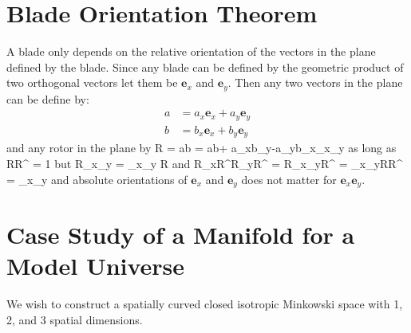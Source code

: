 \chapter{Blade Orientation Theorem}
A blade only depends on the relative orientation of the vectors in the plane defined by the blade.
Since any blade can be defined by the geometric product of two orthogonal vectors let them be $\bm{e}_{x}$ and $\bm{e}_{y}$. 
Then any two vectors in the plane can be define by:
\begin{align}
	a & = a_{x}\bm{e}_{x}+a_{y}\bm{e}_{y} \\
	b & = b_{x}\bm{e}_{x}+b_{y}\bm{e}_{y} 	
\end{align}
and any rotor in the plane by
\be
	R = ab = \lp a\cdot b\rp + \lp a_{x}b_{y}-a_{y}b_{x}\rp {}_{x}_{y}
\ee
as long as
\be
	RR^{\R} = 1
\ee
but
\be
	R_{x}_{y} = _{x}_{y} R
\ee
and
\be
	R_{x}R^{\R}R_{y}R^{\R} = R_{x}_{y}R^{\R} = 
	                                 _{x}_{y}RR^{\R} = _{x}_{y}
\ee
and absolute orientations of $\bm{e}_{x}$ and $\bm{e}_{y}$ does not matter for $\bm{e}_{x}\bm{e}_{y}$.


\chapter{Case Study of a Manifold for a Model Universe}
We wish to construct a spatially curved closed isotropic Minkowski space with 1, 2, and 3 spatial dimensions.

